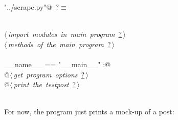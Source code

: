 \documentclass[twoside]{artikel3}
\renewcommand{\NWlink}[2]{\hyperlink{#1}{#2}}
\renewcommand{\NWtarget}[2]{\hypertarget{#1}{#2}}
\renewcommand{\NWsep}{$\diamond$\rule[-1\baselineskip]{0pt}{1\baselineskip}}
\renewcommand{\NWlink}[2]{\hyperlink{#1}{#2}}
\renewcommand{\NWtarget}[2]{\hypertarget{#1}{#2}}
\begin{document}
\begin{flushleft} \small
\begin{minipage}{\linewidth}\label{scrap3}\raggedright\small
\NWtarget{nuweb?}{} \verb@"../scrape.py"@\nobreak\ {\footnotesize {?}}$\equiv$
\vspace{-1ex}
\begin{list}{}{} \item
\mbox{}\verb@@\\
\mbox{}\verb@@\hbox{$\langle\,${\itshape import modules in main program}\nobreak\ {\footnotesize \NWlink{nuweb?}{?}}$\,\rangle$}\verb@@\\
\mbox{}\verb@@\hbox{$\langle\,${\itshape methods of the main program}\nobreak\ {\footnotesize \NWlink{nuweb?}{?}}$\,\rangle$}\verb@@\\
\mbox{}\verb@@\\
\mbox{}\verb@if __name__ == "__main__" :@\\
\mbox{}\verb@    @\hbox{$\langle\,${\itshape get program options}\nobreak\ {\footnotesize \NWlink{nuweb?}{?}}$\,\rangle$}\verb@@\\
\mbox{}\verb@    @\hbox{$\langle\,${\itshape print the testpost}\nobreak\ {\footnotesize \NWlink{nuweb?}{?}}$\,\rangle$}\verb@@\\
\mbox{}\verb@@\\
\mbox{}\verb@@{\NWsep}
\end{list}
\vspace{-1.5ex}
\footnotesize
\begin{list}{}{\setlength{\itemsep}{-\parsep}\setlength{\itemindent}{-\leftmargin}}

\item{}
\end{list}
\end{minipage}\vspace{4ex}
\end{flushleft}
For now, the program just prints a mock-up of a post:
\end{document}
